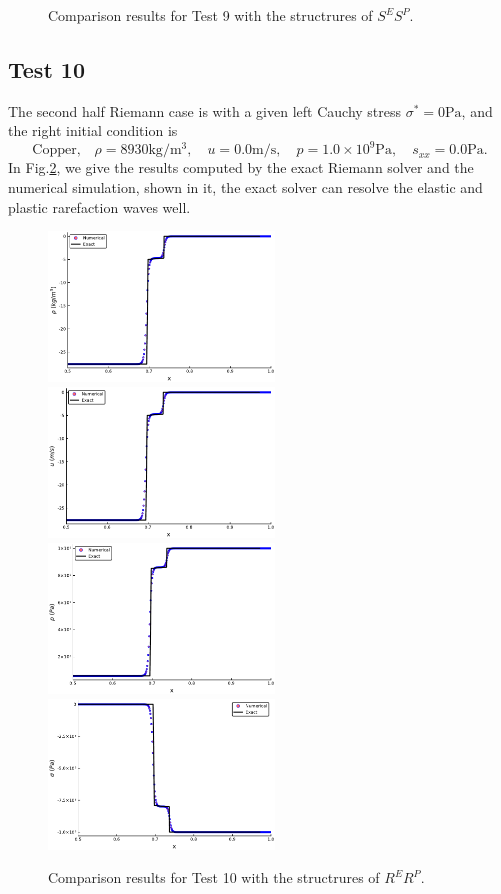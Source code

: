 \documentclass[review]{elsarticle}
\begin{document}
\begin{enumerate}[Step 1]
\begin{figure}
    \caption{Comparison results for Test 9 with the structrures of $S^ES^P$.  }
  \label{fig:case9}
\end{figure}
\subsection{Test 10}
The second half Riemann case is with  a given left Cauchy stress $\sigma^* = 0 \text{Pa}$, and the right initial condition is
\begin{equation}
  \text{Copper,}\quad\rho = 8930\text{kg}/\text{m}^3, \quad  u = 0.0\text{m}/\text{s}, \quad  p =1.0\times 10^9 \text{Pa}, \quad  s_{xx}=0.0\text{Pa}.
\end{equation}
In Fig.\ref{fig:case10}, we give the results computed by the exact Riemann solver and the numerical simulation, shown in it, the exact solver can resolve the elastic and plastic rarefaction waves well.
\begin{figure}
  \centering
  \includegraphics[width= 6cm] {case11rho.pdf}
  \includegraphics[width= 6cm] {case11u.pdf}
  \includegraphics[width= 6cm] {case11p.pdf}
  \includegraphics[width= 6cm] {case11sigma.pdf}
    \caption{Comparison results for Test 10 with the structrures of $R^ER^P$.  }
  \label{fig:case10}
\end{figure}

\end{enumerate}
\end{document}
